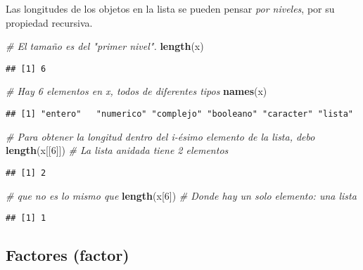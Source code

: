 \documentclass[]{article}
\newenvironment{Shaded}{\begin{snugshade}}{\end{snugshade}}
\newcommand{\KeywordTok}[1]{\textcolor[rgb]{0.13,0.29,0.53}{\textbf{#1}}}
\newcommand{\DecValTok}[1]{\textcolor[rgb]{0.00,0.00,0.81}{#1}}
\newcommand{\CommentTok}[1]{\textcolor[rgb]{0.56,0.35,0.01}{\textit{#1}}}
\newcommand{\NormalTok}[1]{#1}
\begin{document}
Las longitudes de los objetos en la lista se pueden pensar \emph{por
niveles}, por su propiedad recursiva.

\begin{Shaded}
\begin{Highlighting}[]
\CommentTok{# El tamaño es del "primer nivel".}
\KeywordTok{length}\NormalTok{(x)}
\end{Highlighting}
\end{Shaded}

\begin{verbatim}
## [1] 6
\end{verbatim}

\begin{Shaded}
\begin{Highlighting}[]
\CommentTok{# Hay 6 elementos en x, todos de diferentes tipos}
\KeywordTok{names}\NormalTok{(x)}
\end{Highlighting}
\end{Shaded}

\begin{verbatim}
## [1] "entero"   "numerico" "complejo" "booleano" "caracter" "lista"
\end{verbatim}

\begin{Shaded}
\begin{Highlighting}[]
\CommentTok{# Para obtener la longitud dentro del i-ésimo elemento de la lista, debo}
\KeywordTok{length}\NormalTok{(x[[}\DecValTok{6}\NormalTok{]]) }\CommentTok{# La lista anidada tiene 2 elementos}
\end{Highlighting}
\end{Shaded}

\begin{verbatim}
## [1] 2
\end{verbatim}

\begin{Shaded}
\begin{Highlighting}[]
\CommentTok{# que no es lo mismo que}
\KeywordTok{length}\NormalTok{(x[}\DecValTok{6}\NormalTok{]) }\CommentTok{# Donde hay un solo elemento: una lista}
\end{Highlighting}
\end{Shaded}

\begin{verbatim}
## [1] 1
\end{verbatim}

\subsection{Factores (factor)}\label{factores-factor}
\end{document}
